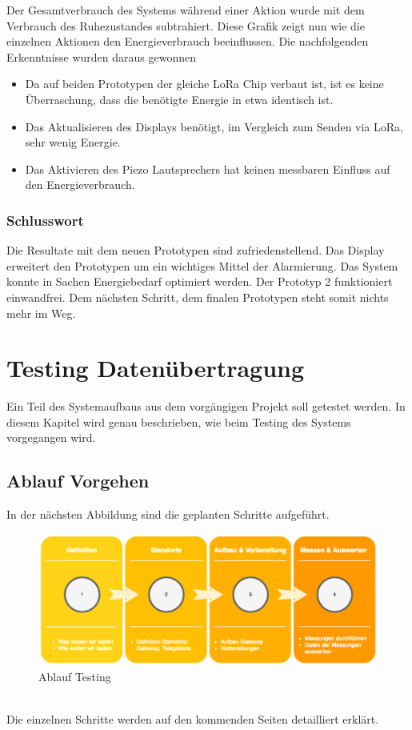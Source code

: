 \documentclass[11pt,english,german]{report}
\theoremstyle{definition}
\begin{document}
\noindent
Der Gesamtverbrauch des Systems während einer Aktion wurde mit dem Verbrauch des Ruhezustandes subtrahiert. Diese Grafik zeigt nun wie die einzelnen Aktionen den Energieverbrauch beeinflussen. Die nachfolgenden Erkenntnisse wurden daraus gewonnen
\begin{itemize}
\item Da auf beiden Prototypen der gleiche LoRa Chip verbaut ist, ist es keine Überraschung, dass die benötigte Energie in etwa identisch ist. 
\item Das Aktualisieren des Displays benötigt, im Vergleich zum Senden via LoRa,  sehr wenig Energie.
\item Das Aktivieren des Piezo Lautsprechers hat keinen messbaren Einfluss auf den Energieverbrauch.
\end{itemize}

\newpage
\subsection{Schlusswort}
Die Resultate mit dem neuen Prototypen sind zufriedenstellend. Das Display erweitert den Prototypen um ein wichtiges Mittel der Alarmierung. Das System konnte in Sachen Energiebedarf optimiert werden. Der Prototyp 2 funktioniert einwandfrei. Dem nächsten Schritt, dem finalen Prototypen steht somit nichts mehr im Weg.


\chapter{Testing Datenübertragung }
Ein Teil des Systemaufbaus aus dem vorgängigen Projekt soll getestet werden. In diesem Kapitel wird genau beschrieben, wie beim Testing des Systems vorgegangen wird.
\section{Ablauf Vorgehen}
In der nächsten Abbildung sind die geplanten Schritte aufgeführt.
\begin{figure}[h]
	\centering
	\includegraphics[width=\textwidth]{img/projectFlow_testing.png}
	\caption[Flowchart Testing]
	{Ablauf Testing}
\end{figure}
\\ 
Die einzelnen Schritte werden auf den kommenden Seiten detailliert erklärt.
\newpage
\end{document}
